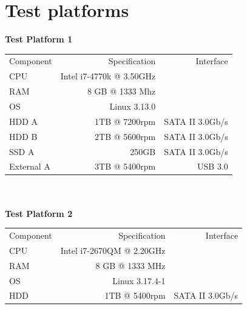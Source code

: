 \documentclass[12pt]{article}
\begin{document}
\section {Test platforms}

\noindent
\textbf{Test Platform 1}\\

\begin{tabular}{|l|r|r|}
  \hline
  Component & Specification                   & Interface \\
  CPU       & Intel i7-4770k @ 3.50GHz        &           \\
  RAM       & 8 GB @ 1333 Mhz                 &           \\
  OS        & Linux 3.13.0                    &           \\
  HDD A     &         1TB @ 7200rpm           & SATA II 3.0Gb/s \\
  HDD B     &                 2TB @ 5600rpm   & SATA II 3.0Gb/s \\
  SSD A     &         250GB                   & SATA II 3.0Gb/s \\
  External A& 3TB @ 5400rpm                   & USB 3.0         \\
  \hline
\end{tabular}\\\\

\noindent
\textbf{Test Platform 2}\\

\begin{tabular}{|l|r|r|}
  \hline
  Component & Specification                   & Interface \\
  CPU       & Intel i7-2670QM @ 2.20GHz       &           \\
  RAM       & 8 GB @ 1333 MHz                 &           \\
  OS        & Linux 3.17.4-1                  &           \\
  HDD       & 1TB @ 5400rpm                   & SATA II 3.0Gb/s  \\
  \hline
\end{tabular}
\end{document}
